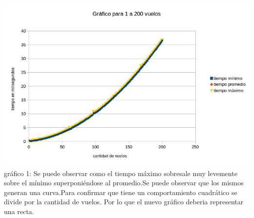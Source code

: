 \documentclass[a4paper]{article}
\begin{document}
\includegraphics[height=3.5in,height=3.5in,keepaspectratio
]{normal.jpg}\newline
gráfico 1: Se puede observar como el tiempo máximo sobresale muy levemente sobre el mínimo superponiéndose al promedio.Se puede observar que los mismos generan una curva.Para confirmar que tiene un comportamiento cuadrático se divide por la cantidad de vuelos. Por lo que el nuevo gráfico deberia representar una recta. \newline
\end{document}
